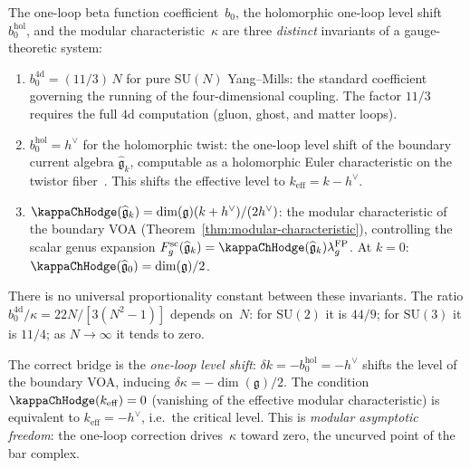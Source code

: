 \begin{remark}
\label{rem:beta-function-kappa-distinction}
The one-loop beta function coefficient~$b_0$, the holomorphic
one-loop level shift~$b_0^{\mathrm{hol}}$, and the modular
characteristic~$\kappa$ are three \emph{distinct} invariants
of a gauge-theoretic system:
\begin{enumerate}[label=\textup{(\roman*)}]
\item $b_0^{4\mathrm{d}} = (11/3)\,N$ for pure $\mathrm{SU}(N)$
 Yang--Mills: the standard coefficient governing the
 running of the four-dimensional coupling. The factor $11/3$
 requires the full $4\mathrm{d}$ computation (gluon, ghost,
 and matter loops).

\item $b_0^{\mathrm{hol}} = h^\vee$ for the holomorphic twist:
 the one-loop level shift of the boundary current algebra
 $\widehat{\mathfrak{g}}_{k}$, computable as a holomorphic
 Euler characteristic on the twistor
 fiber~\cite{Costello2111}. This shifts the effective level to
 $k_{\mathrm{eff}} = k - h^\vee$.

\item $\kappaChHodge(\widehat{\mathfrak{g}}_k)
 = \dim(\mathfrak{g})(k + h^\vee)/(2h^\vee)$: the modular
 characteristic of the boundary VOA
 \textup{(}Theorem~\textup{\ref{thm:modular-characteristic}}\textup{)},
 controlling the scalar genus expansion
 $F_g^{\mathrm{sc}}(\widehat{\mathfrak{g}}_k) =
 \kappaChHodge(\widehat{\mathfrak{g}}_k)
 \lambda_g^{\mathrm{FP}}$. At $k = 0$:
 $\kappaChHodge(\widehat{\mathfrak{g}}_0)=\dim(\mathfrak{g})/2$.
\end{enumerate}
There is no universal proportionality constant between these
invariants. The ratio $b_0^{4\mathrm{d}}/\kappa
= 22N/[3(N^2-1)]$
depends on~$N$: for $\mathrm{SU}(2)$ it is $44/9$; for
$\mathrm{SU}(3)$ it is $11/4$; as $N \to \infty$ it tends
to zero.

The correct bridge is the \emph{one-loop level shift}:
$\delta k = -b_0^{\mathrm{hol}} = -h^\vee$ shifts the level of
the boundary VOA, inducing
$\delta\kappa = -\dim(\mathfrak{g})/2$. The condition
$\kappaChHodge(k_{\mathrm{eff}}) = 0$ (vanishing of the effective
modular characteristic) is equivalent to
$k_{\mathrm{eff}} = -h^\vee$, i.e.\ the critical level. This
is \emph{modular asymptotic freedom}: the one-loop correction
drives~$\kappa$ toward zero, the uncurved point of the bar
complex.
\end{remark}

